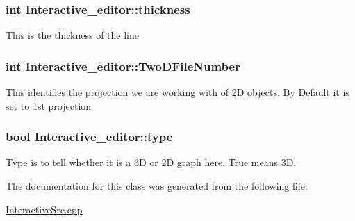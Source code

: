 \subsubsection[{\texorpdfstring{thickness}{thickness}}]{\setlength{\rightskip}{0pt plus 5cm}int Interactive\+\_\+editor\+::thickness}\hypertarget{classInteractive__editor_a65f9bb481055109e9d52e2a6bc2db58e}{}\label{classInteractive__editor_a65f9bb481055109e9d52e2a6bc2db58e}
This is the thickness of the line 
\subsubsection[{\texorpdfstring{Two\+D\+File\+Number}{TwoDFileNumber}}]{\setlength{\rightskip}{0pt plus 5cm}int Interactive\+\_\+editor\+::\+Two\+D\+File\+Number}\hypertarget{classInteractive__editor_a016e5e8e9a124977ab6048c90980be97}{}\label{classInteractive__editor_a016e5e8e9a124977ab6048c90980be97}
This identifies the projection we are working with of 2D objects. By Default it is set to 1st projection 
\subsubsection[{\texorpdfstring{type}{type}}]{\setlength{\rightskip}{0pt plus 5cm}bool Interactive\+\_\+editor\+::type}\hypertarget{classInteractive__editor_a93c2f2041e432c8047d51942345cc3f9}{}\label{classInteractive__editor_a93c2f2041e432c8047d51942345cc3f9}
Type is to tell whether it is a 3D or 2D graph here. True means 3D. 

The documentation for this class was generated from the following file\+:\begin{DoxyCompactItemize}
\item 
\hyperlink{InteractiveSrc_8cpp}{Interactive\+Src.\+cpp}\end{DoxyCompactItemize}

